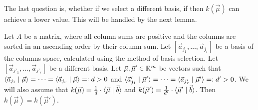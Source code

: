 The last question is, whether if we select a different basis, if then $k(\vec\mu)$ can achieve a lower value. This will be handled by the next lemma.

\begin{lemma}
    Let $A$ be a matrix, where all column sums are positive and the columns are sorted in an ascending order by their column sum. Let $[\vec a_{j_1}, \dots, \vec a_{j_r}]$ be a basis of the columns space, calculated using the method of basis selection. Let $[\vec a_{j'_1}, \dots, \vec a_{j'_r}]$ be a different basis. Let $\vec\mu, \vec\mu' \in \mathbb{R}^m$ be vectors such that $\langle \vec a_{j_1} \mid \vec\mu \rangle = \dots = \langle \vec a_{j_r} \mid \vec\mu \rangle =: d > 0$ and $\langle \vec a'_{j_1} \mid \vec\mu' \rangle = \dots = \langle \vec a_{j'_r} \mid \vec\mu' \rangle =: d' > 0$. We will also assume that $k(\vec \mu) = \frac{1}{d}\cdot\langle \vec{\mu} \mid \vec b \rangle$ and $k(\vec \mu') = \frac{1}{d'}\cdot\langle \vec{\mu}' \mid \vec b \rangle$. Then $k(\vec\mu) = k(\vec\mu')$.
\end{lemma}
